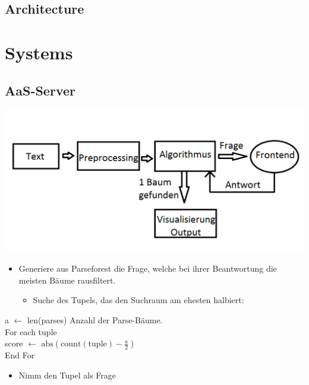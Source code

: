 \documentclass{scrartcl}
\begin{document}
\subsection{Architecture}
\label{sub:Architecture}

\section{Systems}
\label{sec:Systems}

\subsection{AaS-Server}
\label{sub:AaS-Server}

    \includegraphics[scale=0.4]{Grafik}
    \begin{itemize}
        \item Generiere aus Parseforest die Frage, welche bei ihrer Beantwortung die meisten Bäume rausfiltert.
            \begin{itemize}
                    \vspace{5pt}
                \item Suche des Tupels, das den Suchraum am ehesten halbiert:
            \end{itemize}
    \end{itemize}
    \vspace{5pt}

        a $\gets$ len(parses) Anzahl der Parse-Bäume. \\
        For each tuple \\
        score $\gets$ $\mathrm{abs}(\mathrm{count(tuple)} - \frac{a}{2})$ \\
        End For

    \vspace{5pt}
    \begin{itemize}
        \item Nimm den Tupel als Frage
    \end{itemize}
\end{document}
